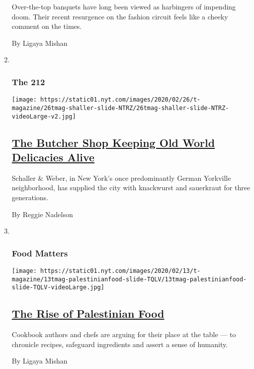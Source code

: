 \begin{enumerate}
  Over-the-top banquets have long been viewed as harbingers of impending
  doom. Their recent resurgence on the fashion circuit feels like a
  cheeky comment on the times.

  By Ligaya Mishan
\item ~
  \hypertarget{the-212-1}{%
  \subsubsection{The 212}\label{the-212-1}}

  \texttt{[image: https://static01.nyt.com/images/2020/02/26/t-magazine/26tmag-shaller-slide-NTRZ/26tmag-shaller-slide-NTRZ-videoLarge-v2.jpg]}

  \hypertarget{the-butcher-shop-keeping-old-world-delicacies-alive}{%
  \subsection{\texorpdfstring{\href{/2020/02/26/t-magazine/schaller-weber.html}{The
  Butcher Shop Keeping Old World Delicacies
  Alive}}{The Butcher Shop Keeping Old World Delicacies Alive}}\label{the-butcher-shop-keeping-old-world-delicacies-alive}}

  Schaller \& Weber, in New York's once predominantly German Yorkville
  neighborhood, has supplied the city with knackwurst and sauerkraut for
  three generations.

  By Reggie Nadelson
\item ~
  \hypertarget{food-matters}{%
  \subsubsection{Food Matters}\label{food-matters}}

  \texttt{[image: https://static01.nyt.com/images/2020/02/13/t-magazine/13tmag-palestinianfood-slide-TQLV/13tmag-palestinianfood-slide-TQLV-videoLarge.jpg]}

  \hypertarget{the-rise-of-palestinian-food}{%
  \subsection{\texorpdfstring{\href{/2020/02/12/t-magazine/palestinian-food.html}{The
  Rise of Palestinian
  Food}}{The Rise of Palestinian Food}}\label{the-rise-of-palestinian-food}}

  Cookbook authors and chefs are arguing for their place at the table
  --- to chronicle recipes, safeguard ingredients and assert a sense of
  humanity.

  By Ligaya Mishan
\end{enumerate}

